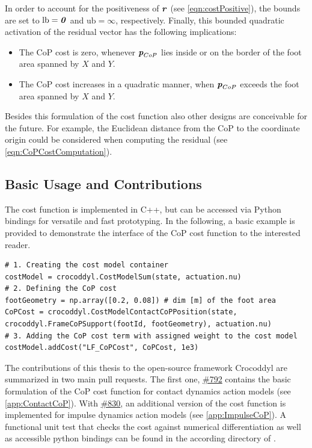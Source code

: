 In order to account for the positiveness of $\bm{\mathit{r}}$ (see \cref{eqn:costPositive}), the bounds are set to $\text{lb}=\bm{\mathit{0}}$ and $\text{ub}=\infty$, respectively. Finally, this bounded quadratic activation of the residual vector has the following implications:
\begin{itemize}
\item The \gls{CoP} cost is zero, whenever $\bm{\mathit{p}}_{CoP}$ lies inside or on the border of the foot area spanned by $X$ and $Y$.
\item The \gls{CoP} cost increases in a quadratic manner, when $\bm{\mathit{p}}_{CoP}$ exceeds the foot area spanned by $X$ and $Y$.
\end{itemize}  
Besides this formulation of the cost function also other designs are conceivable for the future. For example, the Euclidean distance from the CoP to the coordinate origin could be considered when computing the residual (see  \cref{eqn:CoPCostComputation}).

\subsection{Basic Usage and Contributions}
The cost function is implemented in C++, but can be accessed via Python bindings for versatile and fast prototyping. In the following, a basic example is provided to demonstrate the interface of the \gls{CoP} cost function to the interested reader.
\begin{verbatim}
# 1. Creating the cost model container
costModel = crocoddyl.CostModelSum(state, actuation.nu)
# 2. Defining the CoP cost
footGeometry = np.array([0.2, 0.08]) # dim [m] of the foot area
CoPCost = crocoddyl.CostModelContactCoPPosition(state, 
crocoddyl.FrameCoPSupport(footId, footGeometry), actuation.nu)
# 3. Adding the CoP cost term with assigned weight to the cost model
costModel.addCost("LF_CoPCost", CoPCost, 1e3)
\end{verbatim}

The contributions of this thesis to the open-source framework Crocoddyl are summarized in two main pull requests. The first one, \href{https://github.com/loco-3d/crocoddyl/pull/792}{\#792} contains the basic formulation of the \gls{CoP} cost function for contact dynamics action models (see \cref{app:ContactCoP}). With \href{https://github.com/loco-3d/crocoddyl/pull/830}{\#830}, an additional version of the cost function is implemented for impulse dynamics action models (see \cref{app:ImpulseCoP}).
A functional unit test that checks the cost against numerical differentiation as well as accessible python bindings can be found in the according directory of \cite{crocoddylweb}.


